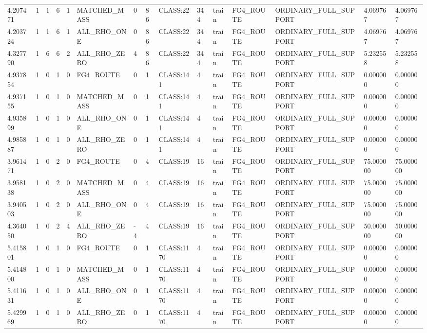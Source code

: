 \begin{tabular}{lllllllllllllll}
4.207471 & 1 & 1 & 6 & 1 & MATCHED\_MASS & 0 & 86 & CLASS:22 & 344 & train & FG4\_ROUTE & ORDINARY\_FULL\_SUPPORT & 4.069767 & 4.069767 \\
4.203724 & 1 & 1 & 6 & 1 & ALL\_RHO\_ONE & 0 & 86 & CLASS:22 & 344 & train & FG4\_ROUTE & ORDINARY\_FULL\_SUPPORT & 4.069767 & 4.069767 \\
4.327790 & 1 & 6 & 6 & 2 & ALL\_RHO\_ZERO & 4 & 86 & CLASS:22 & 344 & train & FG4\_ROUTE & ORDINARY\_FULL\_SUPPORT & 5.232558 & 5.232558 \\
4.937854 & 1 & 0 & 1 & 0 & FG4\_ROUTE & 0 & 1 & CLASS:141 & 4 & train & FG4\_ROUTE & ORDINARY\_FULL\_SUPPORT & 0.000000 & 0.000000 \\
4.937155 & 1 & 0 & 1 & 0 & MATCHED\_MASS & 0 & 1 & CLASS:141 & 4 & train & FG4\_ROUTE & ORDINARY\_FULL\_SUPPORT & 0.000000 & 0.000000 \\
4.935899 & 1 & 0 & 1 & 0 & ALL\_RHO\_ONE & 0 & 1 & CLASS:141 & 4 & train & FG4\_ROUTE & ORDINARY\_FULL\_SUPPORT & 0.000000 & 0.000000 \\
4.985887 & 1 & 0 & 1 & 0 & ALL\_RHO\_ZERO & 0 & 1 & CLASS:141 & 4 & train & FG4\_ROUTE & ORDINARY\_FULL\_SUPPORT & 0.000000 & 0.000000 \\
3.961471 & 1 & 0 & 2 & 0 & FG4\_ROUTE & 0 & 4 & CLASS:19 & 16 & train & FG4\_ROUTE & ORDINARY\_FULL\_SUPPORT & 75.000000 & 75.000000 \\
3.958138 & 1 & 0 & 2 & 0 & MATCHED\_MASS & 0 & 4 & CLASS:19 & 16 & train & FG4\_ROUTE & ORDINARY\_FULL\_SUPPORT & 75.000000 & 75.000000 \\
3.940503 & 1 & 0 & 2 & 0 & ALL\_RHO\_ONE & 0 & 4 & CLASS:19 & 16 & train & FG4\_ROUTE & ORDINARY\_FULL\_SUPPORT & 75.000000 & 75.000000 \\
4.364050 & 1 & 0 & 2 & 4 & ALL\_RHO\_ZERO & -4 & 4 & CLASS:19 & 16 & train & FG4\_ROUTE & ORDINARY\_FULL\_SUPPORT & 50.000000 & 50.000000 \\
5.415801 & 1 & 0 & 1 & 0 & FG4\_ROUTE & 0 & 1 & CLASS:1170 & 4 & train & FG4\_ROUTE & ORDINARY\_FULL\_SUPPORT & 0.000000 & 0.000000 \\
5.414800 & 1 & 0 & 1 & 0 & MATCHED\_MASS & 0 & 1 & CLASS:1170 & 4 & train & FG4\_ROUTE & ORDINARY\_FULL\_SUPPORT & 0.000000 & 0.000000 \\
5.411631 & 1 & 0 & 1 & 0 & ALL\_RHO\_ONE & 0 & 1 & CLASS:1170 & 4 & train & FG4\_ROUTE & ORDINARY\_FULL\_SUPPORT & 0.000000 & 0.000000 \\
5.429969 & 1 & 0 & 1 & 0 & ALL\_RHO\_ZERO & 0 & 1 & CLASS:1170 & 4 & train & FG4\_ROUTE & ORDINARY\_FULL\_SUPPORT & 0.000000 & 0.000000 \\

\end{tabular}
